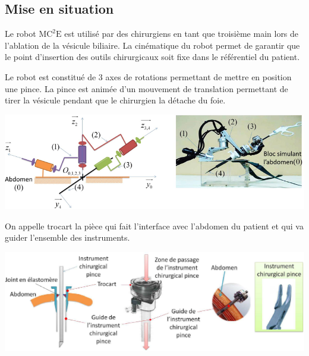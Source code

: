 \documentclass[10pt,fleqn]{article} %
\begin{document}

\vspace{4.5cm}
\pagestyle{fancy}
\thispagestyle{plain}


\def\columnseprulecolor{\color{ocre}}
\setlength{\columnseprule}{0.4pt} 

\ifprof
\else
\begin{multicols}{2}
\fi
\section*{Mise en situation}
\ifprof
\else
Le robot $\text{MC}^2\text{E}$ est utilisé par des chirurgiens en tant que troisième main lors de l'ablation de la vésicule biliaire. La cinématique du robot permet de garantir que le point d'insertion des outils chirurgicaux soit fixe dans le référentiel du patient. 

Le robot est constitué de 3 axes de rotations permettant de mettre en position une pince. La pince est animée d'un mouvement de translation permettant de tirer la vésicule pendant que le chirurgien la détache du foie. 

\begin{center}
\includegraphics[width=\linewidth]{images/fig_02}
\end{center}

On appelle trocart la pièce qui fait l'interface avec l'abdomen du patient et qui va guider l'ensemble des instruments. 

\begin{center}
\includegraphics[width=\linewidth]{images/fig_09}
\end{center}


\end{multicols}
\end{document}

